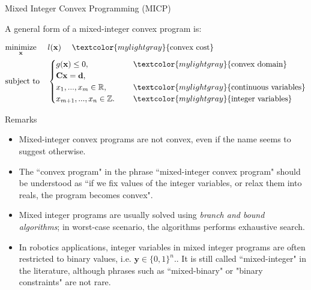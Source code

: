 \documentclass{beamer}
\begin{document}
\begin{frame}{Mixed Integer Convex Programming (MICP)}
\begin{flushleft}

A general form of a mixed-integer convex program is:

%
\begin{equation} \label{QP}
\begin{aligned}
& \underset{\mathbf{x}}{\text{minimize}}
& & 
l(\mathbf{x}) \ \ \ \ \textcolor{mylightgray}{\text{convex cost}} \\
& \text{subject to}
& & \begin{cases} 
g(\mathbf{x}) \leq 0, &\ \ \ \ \textcolor{mylightgray}{\text{convex domain}} \\ 
\mathbf{C}\mathbf{x} = 
\mathbf{d},  &\\
x_1, ..., x_m \in \mathbb{R}, &\ \ \ \ \textcolor{mylightgray}{\text{continuous variables}}\\
x_{m+1}, ..., x_n \in \mathbb{Z}. &\ \ \ \ \textcolor{mylightgray}{\text{integer variables}}
\end{cases}
%
\end{aligned}
\end{equation}
 
\end{flushleft}
\end{frame}



\begin{frame}{Remarks}
\begin{flushleft}

\begin{itemize}
    \item Mixed-integer convex programs are not convex, even if the name seems to suggest otherwise. 
    \item The ``convex program" in the phrase ``mixed-integer convex program" should be understood as ``if we fix values of the integer variables, or relax them into reals, the program becomes convex".
    \item Mixed integer programs are usually solved using \emph{branch and bound algorithms}; in worst-case scenario, the algorithms performs exhaustive search.
    \item In robotics applications, integer variables in mixed integer programs are often restricted to binary values, i.e. $\mathbf{y} \in \{0, 1\}^n.$. It is still called ``mixed-integer" in the literature, although phrases such as ``mixed-binary" or "binary constraints" are not rare.
\end{itemize}
 
\end{flushleft}
\end{frame}
\end{document}
